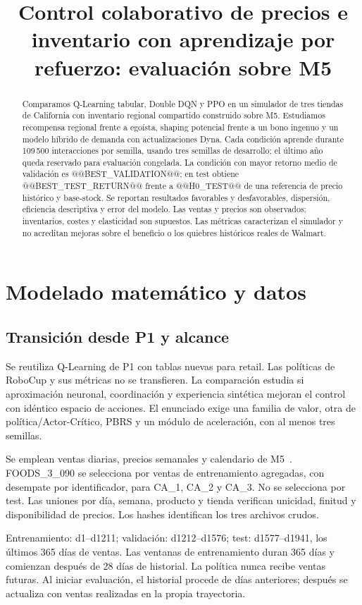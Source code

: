 \documentclass[conference]{IEEEtran}
\title{Control colaborativo de precios e inventario con aprendizaje por refuerzo: evaluación sobre M5}
\author{\IEEEauthorblockN{Leonardo Candio y Dimael Rivas}
\IEEEauthorblockA{Universidad de Ingeniería y Tecnología\\DS5345: Aprendizaje por Refuerzo, 2026-II\\
Grupo 1 --- Fase 2, Vía B}}
\begin{document}
\maketitle
\begin{abstract}
Comparamos Q-Learning tabular, Double DQN y PPO en un simulador de tres tiendas de California con inventario regional compartido construido sobre M5. Estudiamos recompensa regional frente a egoísta, shaping potencial frente a un bono ingenuo y un modelo híbrido de demanda con actualizaciones Dyna. Cada condición aprende durante 109\,500 interacciones por semilla, usando tres semillas de desarrollo; el último año queda reservado para evaluación congelada. La condición con mayor retorno medio de validación es @@BEST_VALIDATION@@; en test obtiene @@BEST_TEST_RETURN@@ frente a @@H0_TEST@@ de una referencia de precio histórico y base-stock. Se reportan resultados favorables y desfavorables, dispersión, eficiencia descriptiva y error del modelo. Las ventas y precios son observados; inventarios, costes y elasticidad son supuestos. Las métricas caracterizan el simulador y no acreditan mejoras sobre el beneficio o los quiebres históricos reales de Walmart.
\end{abstract}

\section{Modelado matemático y datos}
\subsection{Transición desde P1 y alcance}
Se reutiliza Q-Learning de P1 con tablas nuevas para retail. Las políticas de RoboCup y sus métricas no se transfieren. La comparación estudia si aproximación neuronal, coordinación y experiencia sintética mejoran el control con idéntico espacio de acciones. El enunciado exige una familia de valor, otra de política/Actor-Crítico, PBRS y un módulo de aceleración, con al menos tres semillas.

Se emplean ventas diarias, precios semanales y calendario de M5~\cite{m5}. FOODS\_3\_090 se selecciona por ventas de entrenamiento agregadas, con desempate por identificador, para CA\_1, CA\_2 y CA\_3. No se selecciona por test. Las uniones por día, semana, producto y tienda verifican unicidad, finitud y disponibilidad de precios. Los hashes identifican los tres archivos crudos.

Entrenamiento: d1--d1211; validación: d1212--d1576; test: d1577--d1941, los últimos 365 días de ventas. Las ventanas de entrenamiento duran 365 días y comienzan después de 28 días de historial. La política nunca recibe ventas futuras. Al iniciar evaluación, el historial procede de días anteriores; después se actualiza con ventas realizadas en la propia trayectoria.
\end{document}
